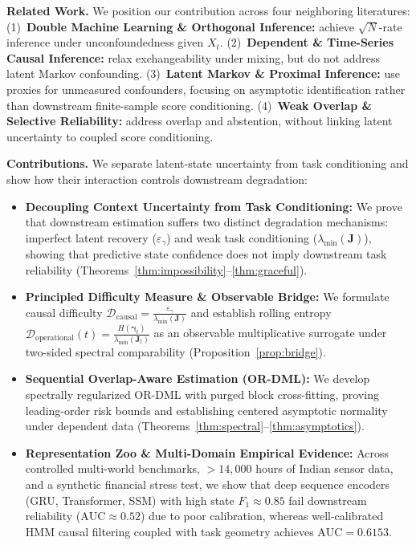 \documentclass[twoside]{article}
\theoremstyle{definition}
\begin{document}
\textbf{Related Work.} We position our contribution across four neighboring literatures: (1)~\textbf{Double Machine Learning \& Orthogonal Inference:} \citet{chernozhukov2018double,chernozhukov2022automatic,foster2023orthogonal,nie2021quasi,kennedy2023towards} achieve $\sqrt{N}$-rate inference under unconfoundedness given $X_t$. (2)~\textbf{Dependent \& Time-Series Causal Inference:} \citet{ciganovic2026dml,semenova2023generalized,lewis2020double,bai2009panel,bonhomme2015grouped,hamilton1989new} relax exchangeability under mixing, but do not address latent Markov confounding. (3)~\textbf{Latent Markov \& Proximal Inference:} \citet{clouth2024latent,huang2023sdci,miao2018identifying,tchetgen2020introduction,mastouri2021proximal,cappe2005inference} use proxies for unmeasured confounders, focusing on asymptotic identification rather than downstream finite-sample score conditioning. (4)~\textbf{Weak Overlap \& Selective Reliability:} \citet{damour2021overlap,shalit2017estimating,crump2009dealing,guo2017calibration,geifman2017selective,sankararaman2023selective} address overlap and abstention, without linking latent uncertainty to coupled score conditioning.

\textbf{Contributions.} We separate latent-state uncertainty from task conditioning and show how their interaction controls downstream degradation:
\begin{itemize}\setlength{\itemsep}{0pt}\setlength{\parskip}{0pt}
    \item \textbf{Decoupling Context Uncertainty from Task Conditioning:} We prove that downstream estimation suffers two distinct degradation mechanisms: imperfect latent recovery ($\varepsilon_\gamma$) and weak task conditioning ($\lambda_{\min}(\boldsymbol{J})$), showing that predictive state confidence does not imply downstream task reliability (Theorems~\ref{thm:impossibility}--\ref{thm:graceful}).
    \item \textbf{Principled Difficulty Measure \& Observable Bridge:} We formulate causal difficulty $\mathcal{D}_{\mathrm{causal}} = \frac{\varepsilon_\gamma}{\lambda_{\min}(\boldsymbol{J})}$ and establish rolling entropy $\mathcal{D}_{\mathrm{operational}}(t) = \frac{H(\boldsymbol{\gamma}_t)}{\lambda_{\min}(\boldsymbol{J}_t)}$ as an observable multiplicative surrogate under two-sided spectral comparability (Proposition~\ref{prop:bridge}).
    \item \textbf{Sequential Overlap-Aware Estimation (OR-DML):} We develop spectrally regularized OR-DML with purged block cross-fitting, proving leading-order risk bounds and establishing centered asymptotic normality under dependent data (Theorems~\ref{thm:spectral}--\ref{thm:asymptotics}).
    \item \textbf{Representation Zoo \& Multi-Domain Empirical Evidence:} Across controlled multi-world benchmarks, $>14,000$ hours of Indian sensor data, and a synthetic financial stress test, we show that deep sequence encoders (GRU, Transformer, SSM) with high state $F_1 \approx 0.85$ fail downstream reliability ($\text{AUC} \approx 0.52$) due to poor calibration, whereas well-calibrated HMM causal filtering coupled with task geometry achieves $\text{AUC} = \mathbf{0.6153}$.
\end{itemize}
\end{document}
